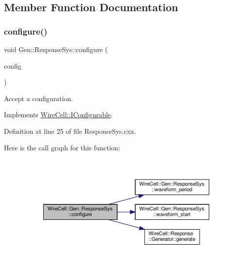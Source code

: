 \subsection{Member Function Documentation}
\mbox{\label{class_wire_cell_1_1_gen_1_1_response_sys_a38a9c888b02b4dcd447016ff77523ab7}} 
\subsubsection{\texorpdfstring{configure()}{configure()}}
{\footnotesize\ttfamily void Gen\+::\+Response\+Sys\+::configure (\begin{DoxyParamCaption}\item[{const \hyperlink{namespace_wire_cell_a9f705541fc1d46c608b3d32c182333ee}{Wire\+Cell\+::\+Configuration} \&}]{config }\end{DoxyParamCaption})\hspace{0.3cm}{\ttfamily [virtual]}}



Accept a configuration. 



Implements \hyperlink{class_wire_cell_1_1_i_configurable_a57ff687923a724093df3de59c6ff237d}{Wire\+Cell\+::\+I\+Configurable}.



Definition at line 25 of file Response\+Sys.\+cxx.

Here is the call graph for this function\+:
\nopagebreak
\begin{figure}[H]
\begin{center}
\leavevmode
\includegraphics[width=350pt]{class_wire_cell_1_1_gen_1_1_response_sys_a38a9c888b02b4dcd447016ff77523ab7_cgraph}
\end{center}
\end{figure}
\mbox{\label{class_wire_cell_1_1_gen_1_1_response_sys_a04c3840c5ba2e0c8046895ed0bd288b9}} 
